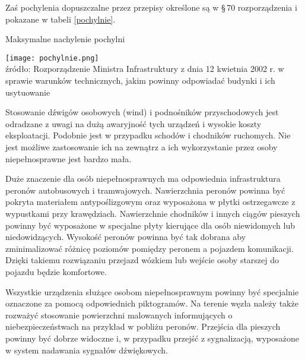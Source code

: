 \documentclass[twoside,12pt]{article}
\begin{document}
	 Zaś pochylenia dopuszczalne przez przepisy określone są w §\,70 rozporządzenia i pokazane w tabeli \ref{pochylnie}.
	 	\begin{table}[H]
		\centering
		\caption{Maksymalne nachylenie pochylni}
		\texttt{[image: pochylnie.png]}\\
		\footnotesize{źródło: Rozporządzenie Ministra Infrastruktury z dnia 12 kwietnia 2002 r.	w sprawie warunków technicznych, jakim powinny odpowiadać budynki i ich usytuowanie \cite{warunki_techniczne}}
		\label{pochylnie}
	\end{table}
	
	Stosowanie dźwigów osobowych (wind) i podnośników przyschodowych jest odradzane z uwagi na dużą awaryjność tych urządzeń i wysokie koszty eksploatacji. Podobnie jest w przypadku schodów i chodników ruchomych. Nie jest możliwe zastosowanie ich na zewnątrz a ich wykorzystanie przez osoby niepełnosprawne jest bardzo mała. 
	
	Duże znaczenie dla osób niepełnosprawnych ma odpowiednia infrastruktura peronów autobusowych i tramwajowych. Nawierzchnia peronów powinna być pokryta materiałem antypoślizgowym oraz wyposażona w płytki ostrzegawcze z wypustkami przy krawędziach. Nawierzchnie chodników i innych ciągów pieszych powinny być wyposażone w specjalne płyty kierujące dla osób niewidomych lub niedowidzących. Wysokość peronów powinna być tak dobrana aby zminimalizować różnicę poziomów pomiędzy peronem a pojazdem komunikacji. Dzięki takiemu rozwiązaniu przejazd wózkiem lub wejście osoby starszej do pojazdu będzie komfortowe.
	
	Wszystkie urządzenia służące osobom niepełnosprawnym powinny być specjalnie oznaczone za pomocą odpowiednich piktogramów. Na terenie węzła należy także rozważyć stosowanie powierzchni malowanych informujących o niebezpieczeństwach na przykład w pobliżu peronów. Przejścia dla pieszych powinny być dobrze widoczne i, w przypadku przejść z sygnalizacją, wyposażone w system nadawania sygnałów dźwiękowych. 
	 
\end{document}
